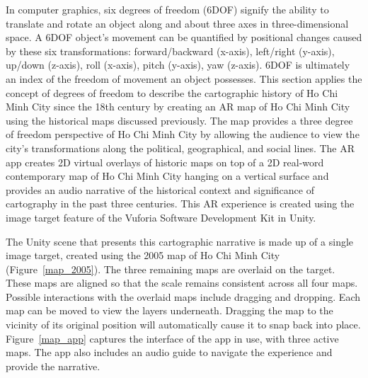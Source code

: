 In computer graphics, six degrees of freedom (6DOF) signify the ability to translate and rotate an object along and about three axes in three-dimensional space. A 6DOF object’s movement can be quantified by positional changes caused by these six transformations: forward/backward (x-axis), left/right (y-axis), up/down (z-axis), roll (x-axis), pitch (y-axis), yaw (z-axis). 6DOF is ultimately an index of the freedom of movement an object possesses. This section applies the concept of degrees of freedom to describe the cartographic history of Ho Chi Minh City since the 18th century by creating an AR map of Ho Chi Minh City using the historical maps discussed previously. The map provides a three degree of freedom perspective of Ho Chi Minh City by allowing the audience to view the city’s transformations along the political, geographical, and social lines. The AR app creates 2D virtual overlays of historic maps on top of a 2D real-word contemporary map of Ho Chi Minh City hanging on a vertical surface and provides an audio narrative of the historical context and significance of cartography in the past three centuries. This AR experience is created using the image target feature of the Vuforia Software Development Kit in Unity.

The Unity scene that presents this cartographic narrative is made up of a single image target, created using the 2005 map of Ho Chi Minh City (Figure~\ref{map_2005}). The three remaining maps are overlaid on the target. These maps are aligned so that the scale remains consistent across all four maps. Possible interactions with the overlaid maps include dragging and dropping. Each map can be moved to view the layers underneath. Dragging the map to the vicinity of its original position will automatically cause it to snap back into place. Figure~\ref{map_app} captures the interface of the app in use, with three active maps. The app also includes an audio guide to navigate the experience and provide the narrative.
\en 

\begin{figure}[!ht]
\end{figure}

